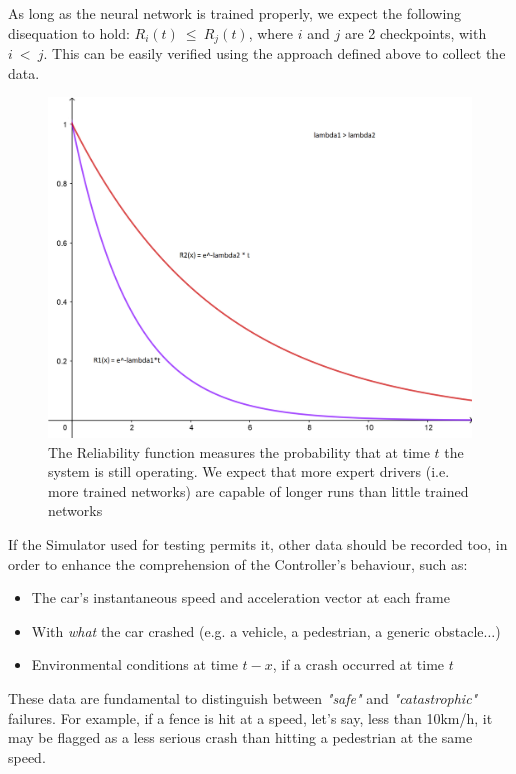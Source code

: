 As long as the neural network is trained properly, we expect the following disequation to hold: $R_{i}(t)\: \leq \: R_{j}(t)$, where $i$ and $j$ are 2 checkpoints, with $i\: <\: j$. This can be easily verified using the approach defined above to collect the data.

\begin{figure}[h!]
	\includegraphics[width=\textwidth]{img/reliability-curve.png}
	\caption{The Reliability function measures the probability that at time $t$ the system is still operating. We expect that more expert drivers (i.e. more trained networks) are capable of longer runs than little trained networks}
\end{figure}

\newpage

If the Simulator used for testing permits it, other data should be recorded too, in order to enhance the comprehension of the Controller's behaviour, such as:

\begin{itemize}
	\item The car's instantaneous speed and acceleration vector at each frame
	\item With \textsl{what} the car crashed (e.g. a vehicle, a pedestrian, a generic obstacle$\dots$)
	\item Environmental conditions at time $t-x$, if a crash occurred at time $t$
\end{itemize}

These data are fundamental to distinguish between \textsl{"safe"} and \textsl{"catastrophic"} failures. For example, if a fence is hit at a speed, let's say, less than 10km/h, it may be flagged as a less serious crash than hitting a pedestrian at the same speed.

